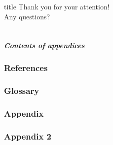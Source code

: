 \documentclass[%
aspectratio=169,%
xcolor=table,%
]{beamer}
\begin{document}

	\begin{frame}[%
		endframe,
	]%
		\centering
		\inserttitlegraphic
		\vfill
		\begin{beamercolorbox}[sep=4pt,center,rounded=true,shadow=true]{title}
			Thank you for your attention!\\
			Any questions?
		\end{beamercolorbox}
		\vfill\vfill
	\end{frame}


	\backupbegin

	\part{}
	\begin{frame}
		\frametitle{Contents of appendices}
		\tableofcontents
	\end{frame}

	\section{References}
	

	\section{Glossary}
	
	\section{Appendix}
	
	\section{Appendix 2}
	

	\backupend
 
\end{document}
